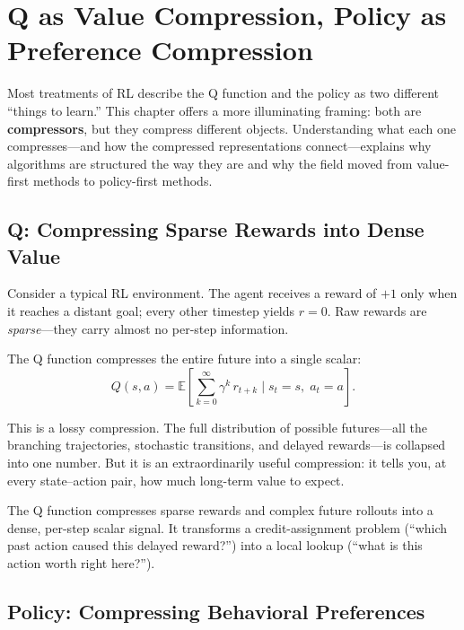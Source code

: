 \chapter{Q as Value Compression, Policy as Preference Compression}
\label{ch:compression}

Most treatments of RL describe the Q function and the policy as two different
``things to learn.''  This chapter offers a more illuminating framing: both are
\textbf{compressors}, but they compress different objects.  Understanding what
each one compresses---and how the compressed representations connect---explains
why algorithms are structured the way they are and why the field moved from
value-first methods to policy-first methods.


\section{Q: Compressing Sparse Rewards into Dense Value}
\label{sec:q-compression}

Consider a typical RL environment.  The agent receives a reward of $+1$ only
when it reaches a distant goal; every other timestep yields $r=0$.  Raw rewards
are \emph{sparse}---they carry almost no per-step information.

The Q function compresses the entire future into a single scalar:
\begin{equation}
  Q(s,a) = \mathbb{E}\!\left[\sum_{k=0}^{\infty}\gamma^k\, r_{t+k}
  \;\Big|\; s_t = s,\; a_t = a\right].
\end{equation}

This is a lossy compression.  The full distribution of possible futures---all
the branching trajectories, stochastic transitions, and delayed rewards---is
collapsed into one number.  But it is an extraordinarily useful compression:
it tells you, at every state--action pair, how much long-term value to expect.

\begin{keyidea}
The Q function compresses sparse rewards and complex future rollouts into a
dense, per-step scalar signal.  It transforms a credit-assignment problem
(``which past action caused this delayed reward?'') into a local lookup
(``what is this action worth right here?'').
\end{keyidea}


\section{Policy: Compressing Behavioral Preferences}
\label{sec:policy-compression}

